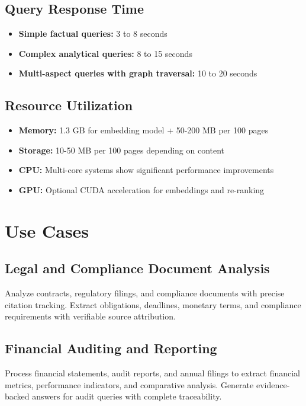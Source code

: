 \documentclass[11pt,a4paper]{article}
\begin{document}
\subsection{Query Response Time}

\begin{itemize}[leftmargin=*]
    \item \textbf{Simple factual queries:} 3 to 8 seconds
    \item \textbf{Complex analytical queries:} 8 to 15 seconds
    \item \textbf{Multi-aspect queries with graph traversal:} 10 to 20 seconds
\end{itemize}

\subsection{Resource Utilization}

\begin{itemize}[leftmargin=*]
    \item \textbf{Memory:} 1.3 GB for embedding model + 50-200 MB per 100 pages
    \item \textbf{Storage:} 10-50 MB per 100 pages depending on content
    \item \textbf{CPU:} Multi-core systems show significant performance improvements
    \item \textbf{GPU:} Optional CUDA acceleration for embeddings and re-ranking
\end{itemize}

\clearpage
\section{Use Cases}

\subsection{Legal and Compliance Document Analysis}

Analyze contracts, regulatory filings, and compliance documents with precise citation tracking. Extract obligations, deadlines, monetary terms, and compliance requirements with verifiable source attribution.

\subsection{Financial Auditing and Reporting}

Process financial statements, audit reports, and annual filings to extract financial metrics, performance indicators, and comparative analysis. Generate evidence-backed answers for audit queries with complete traceability.
\end{document}
